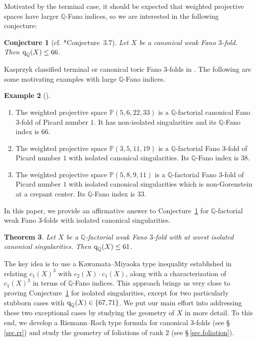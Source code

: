 \documentclass[12pt,twoside]{amsart}
\newcommand{\qQ}{\text{\rm q}_{\mathbb{Q}}}
\newtheorem{thm}{Theorem}[section]
\newtheorem{conj}[thm]{Conjecture}
\theoremstyle{definition}
\newtheorem{ex}[thm]{Example}
\begin{document}
Motivated by the terminal case, it should be expected that weighted projective spaces have larger $\mathbb{Q}$-Fano indices, so we are interested in the following conjecture:
\begin{conj}[{cf. \cite{wang}*{Conjecture~3.7}}]\label{conj.fanobound}
    Let $X$ be a canonical weak Fano $3$-fold. Then $\qQ(X)\leq 66$.
\end{conj}

Kasprzyk classified terminal or canonical toric Fano $3$-folds in \cites{kasprzyk, kasprzyk2}. The following are some motivating examples with large $\mathbb{Q}$-Fano indices.

\begin{ex}[\cite{kasprzyk2}]
    \begin{enumerate}
        \item The weighted projective space $\mathbb P(5,6,22,33)$ is a $\mathbb Q$-factorial canonical Fano $3$-fold of Picard number $1$. It has non-isolated singularities and its $\mathbb Q$-Fano index is $66$. 
        
        \item The weighted projective space $\mathbb P(3,5,11,19)$ is a $\mathbb Q$-factorial Fano $3$-fold of Picard number $1$ with isolated canonical singularities. Its $\mathbb Q$-Fano index is $38$. 
        
        \item The weighted projective space $\mathbb P(5,8,9,11)$ is a $\mathbb Q$-factorial Fano $3$-fold of Picard number $1$ with isolated canonical singularities which is non-Gorenstein at a crepant center. Its $\mathbb Q$-Fano index is $33$. 
    \end{enumerate}
\end{ex}

In this paper, we provide an affirmative answer to Conjecture~\ref{conj.fanobound} for $\mathbb Q$-factorial weak Fano $3$-folds with isolated canonical singularities. 

\begin{thm}\label{thm.main}
    Let $X$ be a $\mathbb Q$-factorial weak Fano $3$-fold with at worst isolated canonical singularities. Then $ \qQ(X)\leq 61$.
\end{thm}

The key idea is to use a Kawamata--Miyaoka type inequality established in \cite{jiang-liu-liu} relating $c_1(X)^3$ with $c_2(X)\cdot c_1(X)$, along with a characterization of $c_1(X)^3$ in terms of $\mathbb Q$-Fano indices. This approach brings us very close to proving Conjecture~\ref{conj.fanobound} for isolated singularities, except for two particularly stubborn cases with $\qQ(X)\in \{67, 71\}$. We put our main effort into addressing these two exceptional cases by studying the geometry of $X$ in more detail. To this end, we develop a Riemann--Roch type  formula for canonical $3$-folds (see \S\,\ref{sec.rr}) and study the geometry of foliations of rank $2$ (see \S\,\ref{sec.foliation}).
\end{document}
